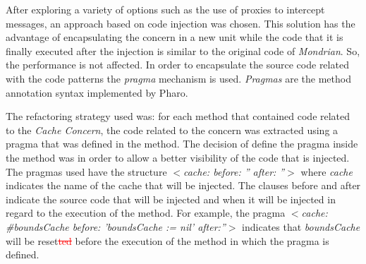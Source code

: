 \documentclass[runningheads]{llncs}
\newcommand{\del}[1]{\textcolor{red}{\sout{#1}}} %
\begin{document}
After exploring a variety of options such as the use of proxies to
intercept messages, an approach based on code injection was chosen.
This solution has the advantage of encapsulating the concern in a
new unit while the code that it is finally executed after the injection
is similar to the original code of \emph{Mondrian}. So, the performance
is not affected. In order to encapsulate the source code related with
the code patterns the \emph{pragma} mechanism is used. \emph{Pragmas}
are the method annotation syntax implemented by Pharo.

The refactoring strategy used was: for each method that contained
code related to the \emph{Cache Concern}, the code related to the
concern was extracted using a pragma that was defined in the method.
The decision of define the pragma inside the method was in order to
allow a better visibility of the code that is injected. The pragmas
used have the structure \emph{$<$cache: before: '' after: ''$>$} where
\emph{cache} indicates the name of the cache that will be injected.
The clauses before and after indicate the source code that will be
injected and when it will be injected in regard to the execution of
the method. For example, the pragma \emph{$<$cache: \#boundsCache before:
'boundsCache := nil' after:''$>$} indicates that \emph{boundsCache}
will be reset\del{ted} before the execution of the method in which the pragma
is defined. 
\end{document}
